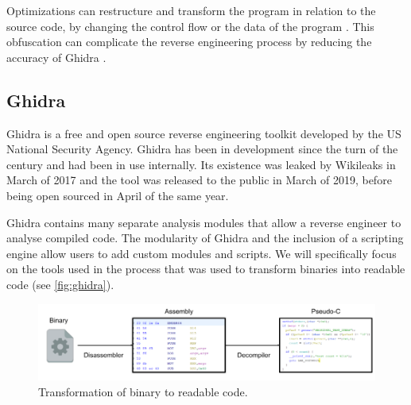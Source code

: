 Optimizations can restructure and transform the program in relation to the source code, by changing the control flow or the data of the program \cite{optimizationObfuscation}. This obfuscation can complicate the reverse engineering process by reducing the accuracy of Ghidra \cite{optimizationObfuscation}.  

\subsection{Ghidra}
Ghidra is a free and open source reverse engineering toolkit developed by the US National Security Agency. Ghidra has been in development since the turn of the century and had been in use internally. Its existence was leaked by Wikileaks in March of 2017 and the tool was released to the public in March of 2019, before being open sourced in April of the same year.

Ghidra contains many separate analysis modules that allow a reverse engineer to analyse compiled code. The modularity of Ghidra and the inclusion of a scripting engine allow users to add custom modules and scripts. We will specifically focus on the tools used in the process that was used to transform binaries into readable code (see \ref{fig:ghidra}).

\label{fig:ghidra}
\begin{figure}[!h]
  \centering
  \includegraphics[width=\linewidth]{img/ghidra.png}
  \caption{Transformation of binary to readable code.}
\end{figure}

